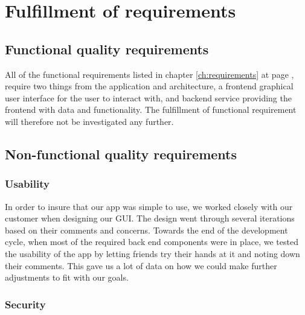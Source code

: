 \section{Fulfillment of requirements}

\subsection{Functional quality requirements}
All of the functional requirements listed in chapter \ref{ch:requirements} at page \pageref{ch:requirements}, require two things from the application and architecture, a frontend graphical user interface for the user to interact with, and backend service providing the frontend with data and functionality. The fulfillment of functional requirement will therefore not be investigated any further.

\subsection{Non-functional quality requirements}

\subsubsection{Usability}
In order to insure that our app was simple to use, we worked closely with our customer when designing our GUI. The design went through several iterations based on their comments and concerns. Towards the end of the development cycle, when most of the required back end components were in place, we tested the usability of the app by letting friends try their hands at it and noting down their comments. This gave us a lot of data on how we could make further adjustments to fit with our goals.

\newpage

\subsubsection{Security}

